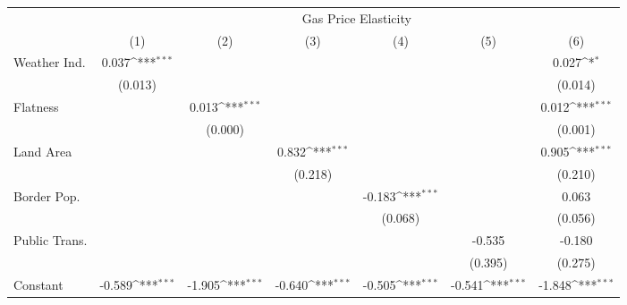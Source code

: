 {
\def\sym#1{\ifmmode^{#1}\else\(^{#1}\)\fi}
\begin{tabular}{l*{6}{c}}
\hline\hline
            &\multicolumn{6}{c}{Gas Price Elasticity}                                                                                           \\
            &\multicolumn{1}{c}{(1)}         &\multicolumn{1}{c}{(2)}         &\multicolumn{1}{c}{(3)}         &\multicolumn{1}{c}{(4)}         &\multicolumn{1}{c}{(5)}         &\multicolumn{1}{c}{(6)}         \\
\hline
Weather Ind.&       0.037\sym{***}&                     &                     &                     &                     &       0.027\sym{*}  \\
            &     (0.013)         &                     &                     &                     &                     &     (0.014)         \\
[1em]
Flatness    &                     &       0.013\sym{***}&                     &                     &                     &       0.012\sym{***}\\
            &                     &     (0.000)         &                     &                     &                     &     (0.001)         \\
[1em]
Land Area   &                     &                     &       0.832\sym{***}&                     &                     &       0.905\sym{***}\\
            &                     &                     &     (0.218)         &                     &                     &     (0.210)         \\
[1em]
Border Pop. &                     &                     &                     &      -0.183\sym{***}&                     &       0.063         \\
            &                     &                     &                     &     (0.068)         &                     &     (0.056)         \\
[1em]
Public Trans.&                     &                     &                     &                     &      -0.535         &      -0.180         \\
            &                     &                     &                     &                     &     (0.395)         &     (0.275)         \\
[1em]
Constant    &      -0.589\sym{***}&      -1.905\sym{***}&      -0.640\sym{***}&      -0.505\sym{***}&      -0.541\sym{***}&      -1.848\sym{***}\\

\end{tabular}}
